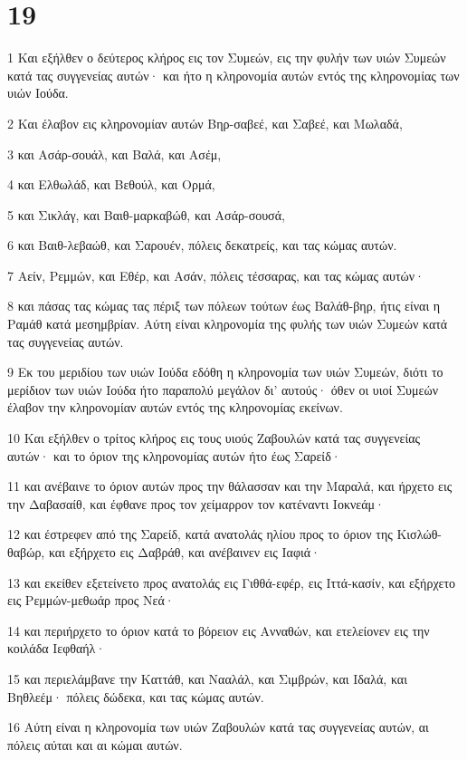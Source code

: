 \chapter{19}

\par 1 Και εξήλθεν ο δεύτερος κλήρος εις τον Συμεών, εις την φυλήν των υιών Συμεών κατά τας συγγενείας αυτών· και ήτο η κληρονομία αυτών εντός της κληρονομίας των υιών Ιούδα.
\par 2 Και έλαβον εις κληρονομίαν αυτών Βηρ-σαβεέ, και Σαβεέ, και Μωλαδά,
\par 3 και Ασάρ-σουάλ, και Βαλά, και Ασέμ,
\par 4 και Ελθωλάδ, και Βεθούλ, και Ορμά,
\par 5 και Σικλάγ, και Βαιθ-μαρκαβώθ, και Ασάρ-σουσά,
\par 6 και Βαιθ-λεβαώθ, και Σαρουέν, πόλεις δεκατρείς, και τας κώμας αυτών.
\par 7 Αείν, Ρεμμών, και Εθέρ, και Ασάν, πόλεις τέσσαρας, και τας κώμας αυτών·
\par 8 και πάσας τας κώμας τας πέριξ των πόλεων τούτων έως Βαλάθ-βηρ, ήτις είναι η Ραμάθ κατά μεσημβρίαν. Αύτη είναι κληρονομία της φυλής των υιών Συμεών κατά τας συγγενείας αυτών.
\par 9 Εκ του μεριδίου των υιών Ιούδα εδόθη η κληρονομία των υιών Συμεών, διότι το μερίδιον των υιών Ιούδα ήτο παραπολύ μεγάλον δι' αυτούς· όθεν οι υιοί Συμεών έλαβον την κληρονομίαν αυτών εντός της κληρονομίας εκείνων.
\par 10 Και εξήλθεν ο τρίτος κλήρος εις τους υιούς Ζαβουλών κατά τας συγγενείας αυτών· και το όριον της κληρονομίας αυτών ήτο έως Σαρείδ·
\par 11 και ανέβαινε το όριον αυτών προς την θάλασσαν και την Μαραλά, και ήρχετο εις την Δαβασαίθ, και έφθανε προς τον χείμαρρον τον κατέναντι Ιοκνεάμ·
\par 12 και έστρεφεν από της Σαρείδ, κατά ανατολάς ηλίου προς το όριον της Κισλώθ-θαβώρ, και εξήρχετο εις Δαβράθ, και ανέβαινεν εις Ιαφιά·
\par 13 και εκείθεν εξετείνετο προς ανατολάς εις Γιθθά-εφέρ, εις Ιττά-κασίν, και εξήρχετο εις Ρεμμών-μεθωάρ προς Νεά·
\par 14 και περιήρχετο το όριον κατά το βόρειον εις Ανναθών, και ετελείονεν εις την κοιλάδα Ιεφθαήλ·
\par 15 και περιελάμβανε την Καττάθ, και Νααλάλ, και Σιμβρών, και Ιδαλά, και Βηθλεέμ· πόλεις δώδεκα, και τας κώμας αυτών.
\par 16 Αύτη είναι η κληρονομία των υιών Ζαβουλών κατά τας συγγενείας αυτών, αι πόλεις αύται και αι κώμαι αυτών.
